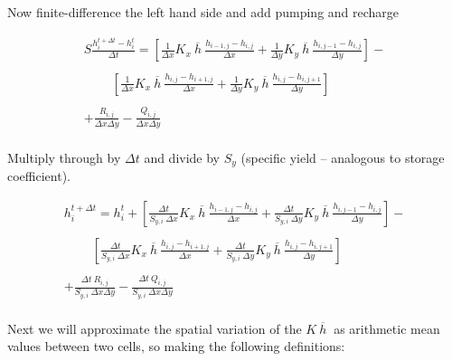 Now finite-difference the left hand side and add pumping and recharge

\begin{equation}
\begin{matrix}
S \frac{h_i^{t+\Delta t}-h_i^{t}}{\Delta t} = 
[\frac{1}{\Delta x} K_{x}~\overline{h}~ \frac{h_{i-1,j} - h_{i,j}}{\Delta x} +
 \frac{1}{\Delta y} K_{y}~\overline{h}~ \frac{h_{i,j-1} - h_{i,j}}{\Delta y}] - \\
~~~~~~~~~~\\
~~~~~~~~~~[ \frac{1}{\Delta x} K_{x}~\overline{h}~  \frac{h_{i,j} - h_{i+1,j}}{\Delta x} +
  \frac{1}{\Delta y}  K_{y}~\overline{h}~ \frac{h_{i,j} - h_{i,j+1}}{\Delta y} ]          \\
  ~~~~~~~\\
  + \frac{R_{i,j}}{\Delta x \Delta y} - \frac{Q_{i,j}}{\Delta x \Delta y} \\     
\end{matrix}        
\end{equation}

Multiply through by $\Delta t$ and divide by $S_y$ (specific yield -- analogous to storage coefficient).

\begin{equation}
\begin{matrix}
h_i^{t+\Delta t}= h_i^{t} +
[\frac{\Delta t}{S_{y,i}~\Delta x} K_{x}~\overline{h}~ \frac{h_{i-1,j} - h_{i,j}}{\Delta x} +
 \frac{\Delta t}{S_{y,i}~\Delta y} K_{y}~\overline{h}~ \frac{h_{i,j-1} - h_{i,j}}{\Delta y}] - \\
~~~~~~~~~~\\
~~~~~~~~~~[ \frac{\Delta t}{S_{y,i}~\Delta x} K_{x}~\overline{h}~  \frac{h_{i,j} - h_{i+1,j}}{\Delta x} +
  \frac{\Delta t}{S_{y,i}~\Delta y}  K_{y}~\overline{h}~ \frac{h_{i,j} - h_{i,j+1}}{\Delta y} ]          \\
  ~~~~~~~\\
  + \frac{\Delta t~R_{i,j}}{S_{y,i}~\Delta x \Delta y} - \frac{\Delta t~Q_{i,j}}{S_{y,i}~\Delta x \Delta y} \\     
\end{matrix}        
\end{equation}

Next we will approximate the spatial variation of the $K~\overline{h}~$ as arithmetic mean values between two cells, so making the following definitions:

